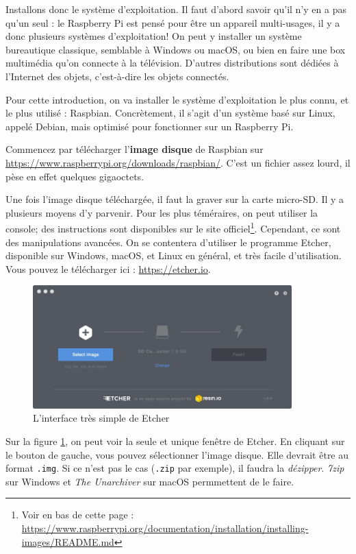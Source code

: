 Installons donc le système d'exploitation. Il faut d'abord savoir qu'il n'y en a pas qu'un seul : le Raspberry Pi est pensé pour être un appareil multi-usages, il y a donc plusieurs systèmes d'exploitation! On peut y installer un système bureautique classique, semblable à Windows ou macOS, ou bien en faire une box multimédia qu'on connecte à la télévision. D'autres distributions sont dédiées à l'Internet des objets, c'est-à-dire les objets connectés.

Pour cette introduction, on va installer le système d'exploitation le plus connu, et le plus utilisé : Raspbian. Concrètement, il s'agit d'un système basé sur Linux, appelé Debian, mais optimisé pour fonctionner sur un Raspberry Pi.

Commencez par télécharger l'\textbf{image disque} de Raspbian sur \url{https://www.raspberrypi.org/downloads/raspbian/}. C'est un fichier assez lourd, il pèse en effet quelques gigaoctets.

Une fois l'image disque téléchargée, il faut la graver sur la carte micro-SD. Il y a plusieurs moyens d'y parvenir. Pour les plus téméraires, on peut utiliser la console; des instructions sont disponibles sur le site officiel\footnote{Voir en bas de cette page : \url{https://www.raspberrypi.org/documentation/installation/installing-images/README.md}}. Cependant, ce sont des manipulations avancées. On se contentera d'utiliser le programme Etcher, disponible sur Windows, macOS, et Linux en général, et très facile d'utilisation. Vous pouvez le télécharger ici : \url{https://etcher.io}.

\begin{figure}[h!]
\begin{center}
\includegraphics[width=10cm]{etcher.jpg}
\end{center}
\caption{L'interface très simple de Etcher}
\label{etcher}
\end{figure}

Sur la figure \ref{etcher}, on peut voir la seule et unique fenêtre de Etcher. En cliquant sur le bouton de gauche, vous pouvez sélectionner l'image disque. Elle devrait être au format \texttt{.img}. Si ce n'est pas le cas (\texttt{.zip} par exemple), il faudra la \textit{dézipper}. \textit{7zip} sur Windows et \textit{The Unarchiver} sur macOS permmettent de le faire.

